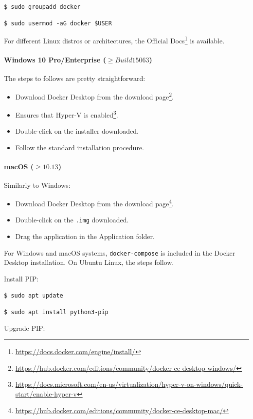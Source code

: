 \documentclass[a4paper,12pt]{article}
\begin{document}
\quad \texttt{\$ sudo groupadd docker}
  
\quad \texttt{\$ sudo usermod -aG docker \$USER}

For different Linux distros or architectures, the Official Docs\footnote{\url{https://docs.docker.com/engine/install/}} is available.

\paragraph{Windows 10 Pro/Enterprise ($\geq Build 15063$)} The steps to follows are pretty straightforward:

\begin{itemize}
    \item[1.] Download Docker Desktop from the download page\footnote{\url{https://hub.docker.com/editions/community/docker-ce-desktop-windows/}}.
    \item[2.] Ensures that Hyper-V is enabled\footnote{\url{https://docs.microsoft.com/en-us/virtualization/hyper-v-on-windows/quick-start/enable-hyper-v}}.
    \item[3.] Double-click on the installer downloaded.
    \item[4.] Follow the standard installation procedure.
\end{itemize}

\paragraph{macOS ($\geq 10.13$)} Similarly to Windows:

\begin{itemize}
    \item[1.] Download Docker Desktop from the download page\footnote{\url{https://hub.docker.com/editions/community/docker-ce-desktop-mac/}}.
    \item[2.] Double-click on the \texttt{.img} downloaded.
    \item[3.] Drag the application in the Application folder.
\end{itemize}

For Windows and macOS systems, \texttt{docker-compose} is included in the Docker Desktop installation. On Ubuntu Linux, the steps follow.

Install PIP:

\quad \texttt{\$ sudo apt update}
  
\quad \texttt{\$ sudo apt install python3-pip}

Upgrade PIP:
\end{document}

